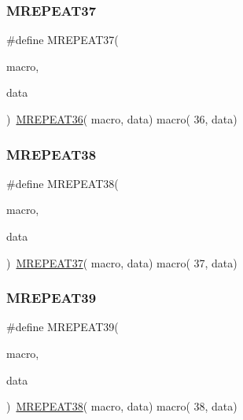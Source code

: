 \mbox{\label{group__group__sam0__utils__mrepeat_ga82184cd9b81480efe7d23bb1bd035645}} 
\subsubsection{\texorpdfstring{MREPEAT37}{MREPEAT37}}
{\footnotesize\ttfamily \#define M\+R\+E\+P\+E\+A\+T37(\begin{DoxyParamCaption}\item[{}]{macro,  }\item[{}]{data }\end{DoxyParamCaption})~\mbox{\hyperlink{group__group__sam0__utils__mrepeat_gad01671ded2811e1cabe5d5642ebb4987}{M\+R\+E\+P\+E\+A\+T36}}( macro, data)   macro( 36, data)}

\mbox{\label{group__group__sam0__utils__mrepeat_ga809e564faa3a2869dbe184488e37a7b2}} 
\subsubsection{\texorpdfstring{MREPEAT38}{MREPEAT38}}
{\footnotesize\ttfamily \#define M\+R\+E\+P\+E\+A\+T38(\begin{DoxyParamCaption}\item[{}]{macro,  }\item[{}]{data }\end{DoxyParamCaption})~\mbox{\hyperlink{group__group__sam0__utils__mrepeat_ga82184cd9b81480efe7d23bb1bd035645}{M\+R\+E\+P\+E\+A\+T37}}( macro, data)   macro( 37, data)}

\mbox{\label{group__group__sam0__utils__mrepeat_ga8940da677b29febf21ca13b7c42d97a2}} 
\subsubsection{\texorpdfstring{MREPEAT39}{MREPEAT39}}
{\footnotesize\ttfamily \#define M\+R\+E\+P\+E\+A\+T39(\begin{DoxyParamCaption}\item[{}]{macro,  }\item[{}]{data }\end{DoxyParamCaption})~\mbox{\hyperlink{group__group__sam0__utils__mrepeat_ga809e564faa3a2869dbe184488e37a7b2}{M\+R\+E\+P\+E\+A\+T38}}( macro, data)   macro( 38, data)}

